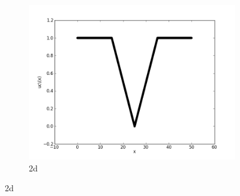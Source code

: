 \documentclass{report}
\begin{document}
\begin{figure}[ht]
\begin{subfigure}[b]{0.5\textwidth}
                \includegraphics[width=\textwidth]{ex2d.png}
                \caption{2d}
	\end{subfigure}
\end{figure}


\newpage
\end{document}

